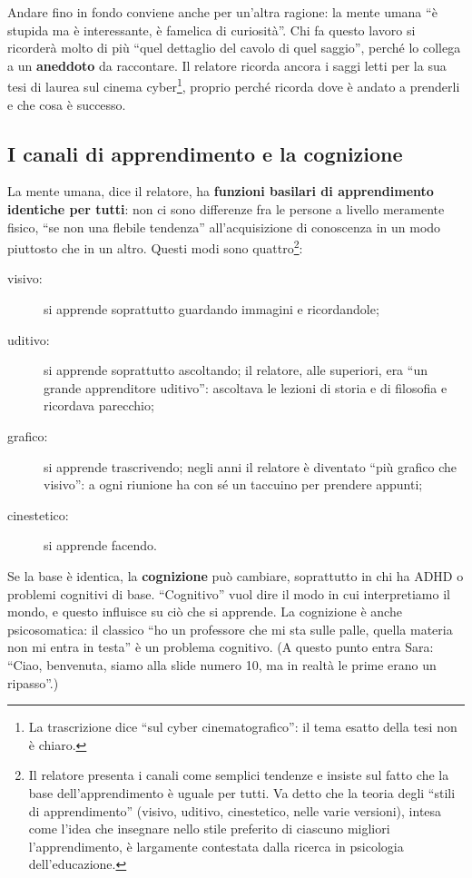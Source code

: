 Andare fino in fondo conviene anche per un'altra ragione: la mente umana ``è
stupida ma è interessante, è famelica di curiosità''. Chi fa questo lavoro si
ricorderà molto di più ``quel dettaglio del cavolo di quel saggio'', perché
lo collega a un \textbf{aneddoto} da raccontare. Il relatore ricorda ancora i
saggi letti per la sua tesi di laurea sul cinema cyber\footnote{La
trascrizione dice ``sul cyber cinematografico'': il tema esatto della tesi
non è chiaro.}, proprio perché ricorda dove è andato a prenderli e che cosa
è successo.

\subsection{I canali di apprendimento e la cognizione}

La mente umana, dice il relatore, ha \textbf{funzioni basilari di
apprendimento identiche per tutti}: non ci sono differenze fra le persone a
livello meramente fisico, ``se non una flebile tendenza'' all'acquisizione
di conoscenza in un modo piuttosto che in un altro. Questi modi sono
quattro\footnote{Il relatore presenta i canali come semplici tendenze e
insiste sul fatto che la base dell'apprendimento è uguale per tutti. Va
detto che la teoria degli ``stili di apprendimento'' (visivo, uditivo,
cinestetico, nelle varie versioni), intesa come l'idea che insegnare nello
stile preferito di ciascuno migliori l'apprendimento, è largamente
contestata dalla ricerca in psicologia dell'educazione.}:
\begin{description}
  \item[visivo:] si apprende soprattutto guardando immagini e ricordandole;
  \item[uditivo:] si apprende soprattutto ascoltando; il relatore, alle
        superiori, era ``un grande apprenditore uditivo'': ascoltava le
        lezioni di storia e di filosofia e ricordava parecchio;
  \item[grafico:] si apprende trascrivendo; negli anni il relatore è
        diventato ``più grafico che visivo'': a ogni riunione ha con sé un
        taccuino per prendere appunti;
  \item[cinestetico:] si apprende facendo.
\end{description}

Se la base è identica, la \textbf{cognizione} può cambiare, soprattutto in
chi ha ADHD o problemi cognitivi di base. ``Cognitivo'' vuol dire il modo in
cui interpretiamo il mondo, e questo influisce su ciò che si apprende. La
cognizione è anche psicosomatica: il classico ``ho un professore che mi sta
sulle palle, quella materia non mi entra in testa'' è un problema cognitivo.
(A questo punto entra Sara: ``Ciao, benvenuta, siamo alla slide numero 10,
ma in realtà le prime erano un ripasso''.)

